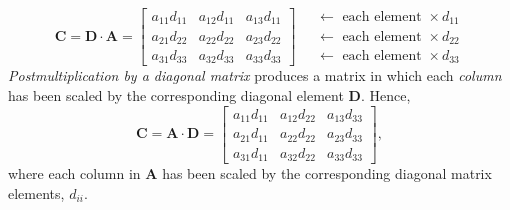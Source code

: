 \begin{equation}
\mathbf{C = D \cdot A}  =  \left[ \begin{array}{ccc}
a_{11}d_{11} & a_{12}d_{11} & a_{13}d_{11}\\
a_{21}d_{22} & a_{22}d_{22} & a_{23}d_{22}\\
a_{31}d_{33} & a_{32}d_{33} & a_{33}d_{33}
\end{array} \right]
\quad 
\begin{array}{l}
\leftarrow \mbox{ each element } \times d_{11}\\
\leftarrow \mbox{ each element } \times d_{22}\\
\leftarrow \mbox{ each element } \times d_{33}
\end{array} 
\end{equation}
\emph{Postmultiplication by a diagonal matrix} produces a matrix in which each \emph{column} has been 
scaled by the corresponding diagonal element $\mathbf{D}$.  Hence,
\begin{equation}
\mathbf{C = A \cdot D} = \left[\begin{array}{ccc} a_{11} d_{11} & a_{12} d_{22} & a_{13} d_{33}\\
a_{21} d_{11} & a_{22} d_{22} & a_{23} d_{33}\\
a_{31} d_{11} & a_{32}d_{22} & a_{33} d_{33}
\end{array} \right],
\end{equation}	 
where each column in $\mathbf{A}$ has been scaled by the corresponding diagonal matrix elements, $d_{ii}$.

